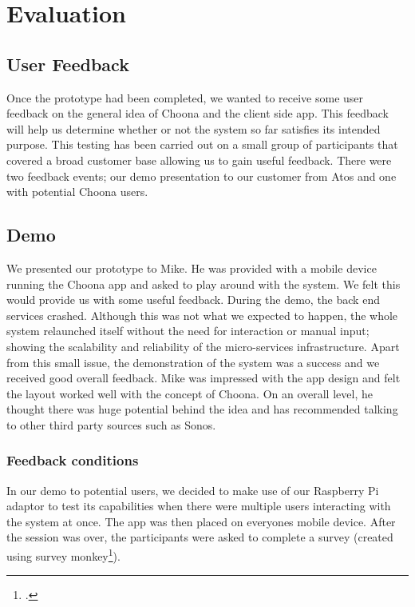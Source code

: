 \section{Evaluation}

\subsection{User Feedback}
Once the prototype had been completed, we wanted to receive some user feedback on the general idea of Choona and the client side app. This feedback will help us determine whether or not the system so far satisfies its intended purpose. This testing has been carried out on a small group of participants that covered a broad customer base allowing us to gain useful feedback.  There were two feedback events; our demo presentation to our customer from Atos and one with potential Choona users.

\subsection{Demo}
We presented our prototype to Mike.  He was provided with a mobile device running the Choona app and asked to play around with the system.  We felt this would provide us with some useful feedback.  During the demo, the back end services crashed.  Although this was not what we expected to happen, the whole system relaunched itself without the need for interaction or manual input; showing the scalability and reliability of the micro-services infrastructure.  Apart from this small issue, the demonstration of the system was a success and we received good overall feedback.  Mike was impressed with the app design and felt the layout worked well with the concept of Choona.  On an overall level, he thought there was huge potential behind the idea and has recommended talking to other third party sources such as Sonos.  

\subsubsection{Feedback conditions}
In our demo to potential users, we decided to make use of our Raspberry Pi adaptor to test its capabilities when there were multiple users interacting with the system at once. The app was then placed on everyones mobile device. After the session was over, the participants were asked to complete a survey (created using survey monkey\footcite{survey}).

